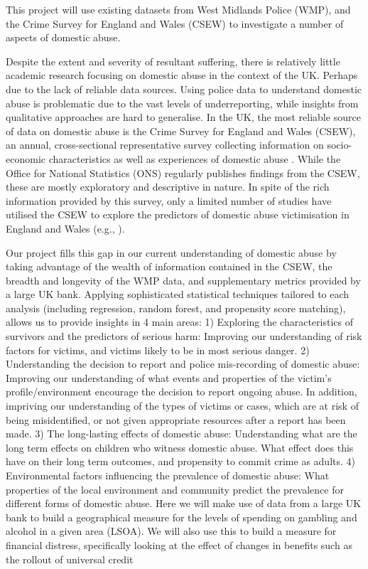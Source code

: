 This project will use existing datasets from West Midlands Police (WMP), and the Crime Survey for England and Wales (CSEW) to investigate a number of aspects of domestic abuse.

Despite the extent and severity of resultant suffering, there is relatively little academic research focusing on domestic abuse in the context of the UK. Perhaps due to the lack of reliable data sources. Using police data to understand domestic abuse is problematic due to the vast levels of underreporting, while insights from qualitative approaches are hard to generalise. In the UK, the most reliable source of data on domestic abuse is the Crime Survey for England and Wales (CSEW), an annual, cross-sectional representative survey collecting information on socio-economic characteristics as well as experiences of domestic abuse \cite{OfficeforNationalStatistics2019}.  While the Office for National Statistics (ONS) regularly publishes findings from the CSEW, these are mostly exploratory and descriptive in nature. In spite of the rich information provided by this survey, only a limited number of studies have utilised the CSEW to explore the predictors of domestic abuse victimisation in England and Wales (e.g., ). 

Our project fills this gap in our current understanding of domestic abuse by taking advantage of the wealth of information contained in the CSEW, the breadth and longevity of the WMP data, and supplementary metrics provided by a large UK bank. Applying sophisticated statistical techniques tailored to each analysis (including regression, random forest, and propensity score matching), allows us to provide insights in 4 main areas:
1) Exploring the characteristics of survivors and the predictors of serious harm: Improving our understanding of risk factors for victims, and victims likely to be in most serious danger.
2) Understanding the decision to report and police mis-recording of domestic abuse: Improving our understanding of what events and properties of the victim’s profile/environment encourage the decision to report ongoing abuse. In addition, impriving our understanding of the types of victims or cases, which are at risk of being misidentified, or not given appropriate resources after a report has been made.
3) The long-lasting effects of domestic abuse: Understanding what are the long term effects on children who witness domestic abuse. What effect does this have on their long term outcomes, and propensity to commit crime as adults.
4) Environmental factors influencing the prevalence of domestic abuse: What properties of the local environment and community predict the prevalence for different forms of domestic abuse. Here we will make use of data from a large UK bank to build a geographical measure for the levels of spending on gambling and alcohol in a given area (LSOA). We will also use this to build a measure for financial distress, specifically looking at the effect of changes in benefits such as the rollout of universal credit
